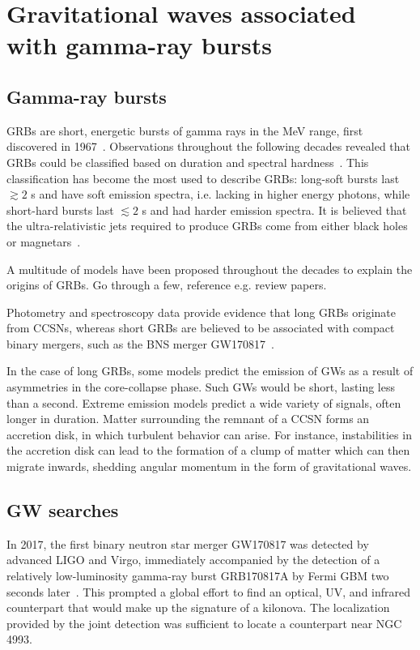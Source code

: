 \chapter{Gravitational waves associated with gamma-ray bursts}\label{ch:grb}

\section{Gamma-ray bursts}\label{sec:grb-astro}

\Acp{GRB} are short, energetic bursts of gamma rays in the MeV range, first discovered in 1967~\citep{Klebesadel_1973}.
Observations throughout the following decades revealed that \acp{GRB} could be classified based on duration and spectral hardness~\citep{Kouveliotou_1993}.
This classification has become the most used to describe \acp{GRB}: long-soft bursts last $\gtrsim2$ s and have soft emission spectra, i.e. lacking in higher energy photons, while short-hard bursts last $\lesssim2$ s and had harder emission spectra.
It is believed that the ultra-relativistic jets required to produce \acp{GRB} come from either black holes~\citep{Woosley_1993} or magnetars~\citep{Dai_1998}.

A multitude of models have been proposed throughout the decades to explain the origins of \acp{GRB}. {\color{red}Go through a few, reference e.g. review papers.}

Photometry and spectroscopy data provide evidence that long \acp{GRB} originate from \acp{CCSN}, whereas short \acp{GRB} are believed to be associated with compact binary mergers, such as the \ac{BNS} merger GW170817~\citep{gw170817_grb}.

In the case of long \acp{GRB}, some models predict the emission of \acp{GW} as a result of asymmetries in the core-collapse phase.
Such \acp{GW} would be short, lasting less than a second.
Extreme emission models predict a wide variety of signals, often longer in duration.
Matter surrounding the remnant of a \ac{CCSN} forms an accretion disk, in which turbulent behavior can arise.
For instance, instabilities in the accretion disk can lead to the formation of a clump of matter which can then migrate inwards, shedding angular momentum in the form of gravitational waves.

\section{GW searches}\label{sec:grb-searches}

In 2017, the first binary neutron star merger GW170817 was detected by advanced LIGO and Virgo, immediately accompanied by the detection of a relatively low-luminosity gamma-ray burst GRB170817A by Fermi \ac{GBM} two seconds later~\citep{gw170817}.
This prompted a global effort to find an optical, UV, and infrared counterpart that would make up the signature of a kilonova.
The localization provided by the joint detection was sufficient to locate a counterpart near NGC 4993.

